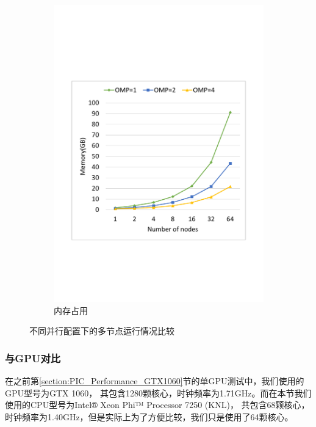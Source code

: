 \begin{figure}[!htb]
\begin{subfigure}[b]{0.48\textwidth}
        \includegraphics[width=\textwidth]{Img/PIC_speedup_Cori_multi_nodes_memory.pdf}
        \caption{内存占用}
    \end{subfigure}
    \caption{不同并行配置下的多节点运行情况比较}
    \label{fig:PIC_speedup_Cori_multi_nodes_timeMemory}
\end{figure}

\subsubsection{与GPU对比}

在之前第\ref{section:PIC_Performance_GTX1060}节的单GPU测试中，我们使用的GPU型号为GTX 1060，
其包含1280颗核心，时钟频率为1.71GHz。而在本节我们使用的CPU型号为Intel® Xeon Phi™ Processor 7250 (KNL)，
共包含68颗核心，时钟频率为1.40GHz，但是实际上为了方便比较，我们只是使用了64颗核心。

